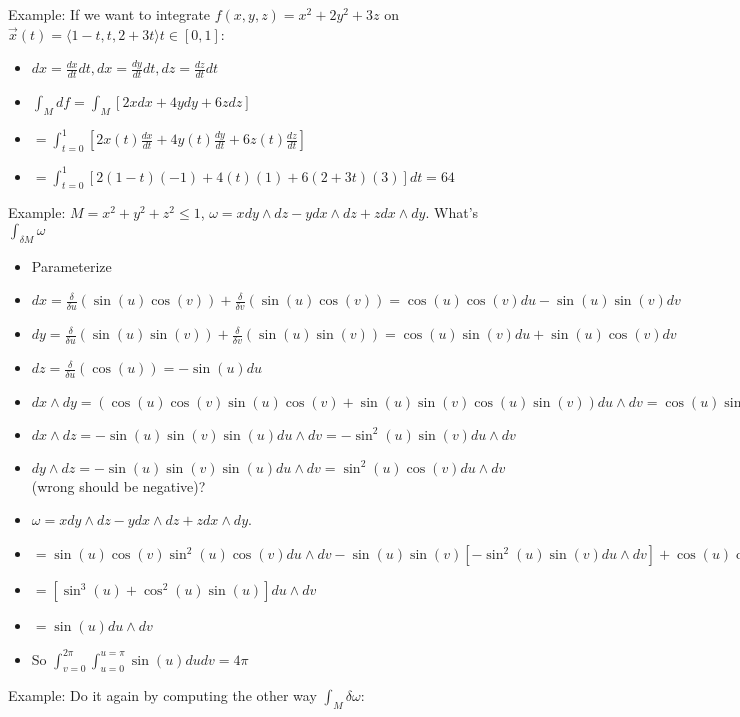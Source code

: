 \documentclass[11pt, oneside]{article}   	%
\begin{document}
Example: If we want to integrate $f(x,y,z) = x^2 + 2y^2 + 3z$ on $\vec{x}(t) = \langle 1-t, t, 2+3t\rangle t \in [0,1]$:

\begin{itemize}
\item $dx = \frac{dx}{dt}dt, dx = \frac{dy}{dt}dt, dz = \frac{dz}{dt}dt$
\item $\int_M df = \int_M[2xdx + 4ydy + 6zdz]$
\item $= \int_{t=0}^1 [2x(t) \frac{dx}{dt} + 4y(t)\frac{dy}{dt} + 6z(t) \frac{dz}{dt}]$
\item $= \int_{t=0}^1 [2(1-t)(-1) + 4(t)(1) + 6(2+3t)(3)]dt = 64$
\end{itemize}

Example: $M = x^2 + y^2 + z^2 \leq 1$, $\omega = x dy \wedge dz -ydx\wedge dz + z dx \wedge dy$.  What's $\int_{\delta M}\omega$

\begin{itemize}
\item Parameterize
\item $dx = \frac{\delta}{\delta u}(\sin(u)\cos(v)) + \frac{\delta}{\delta v}(\sin(u)\cos(v)) = \cos(u)\cos(v)du-\sin(u)\sin(v)dv$
\item $dy = \frac{\delta}{\delta u}(\sin(u)\sin(v)) + \frac{\delta}{\delta v}(\sin(u)\sin(v)) = \cos(u)\sin(v)du+\sin(u)\cos(v)dv$
\item $dz = \frac{\delta}{\delta u}(\cos(u)) = -\sin(u)du$
\item $dx \wedge dy = ( \cos(u)\cos(v)\sin(u)\cos(v) + \sin(u)\sin(v) \cos(u)\sin(v)) du \wedge dv =  \cos(u)\sin(u) du \wedge dv $
\item $dx \wedge dz = -\sin(u)\sin(v)\sin(u) du \wedge dv =  -\sin^2(u)\sin(v) du \wedge dv $
\item $dy \wedge dz = -\sin(u)\sin(v)\sin(u) du \wedge dv =  \sin^2(u)\cos(v) du \wedge dv $ (wrong should be negative)?
\item $\omega = x dy \wedge dz -ydx\wedge dz + z dx \wedge dy$.
\item  $= \sin(u)\cos(v) \sin^2(u)\cos(v) du \wedge dv - \sin(u)\sin(v)[  -\sin^2(u)\sin(v) du \wedge dv] + \cos(u) \cos(u)\sin(u) du \wedge dv$
\item $=[\sin^3(u) + \cos^2(u)\sin(u)]  du \wedge dv$
\item $= \sin(u)  du \wedge dv$
\item So $\int_{v=0}^{2\pi}\int_{u=0}^{u=\pi} \sin(u)dudv  = 4\pi$
\end{itemize}

Example: Do it again by computing the other way $\int_M \delta\omega$:
\end{document}
